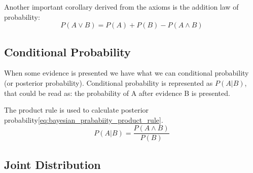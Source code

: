 Another important corollary derived from the axioms is the addition law of probability:
\begin{equation}
P(A\vee B)=P(A)+P(B) - P(A\wedge B)
\end{equation}

\subsection{Conditional Probability}
\label{subsubsec:conditionalprobability}
When some evidence is presented we have what we can conditional probability (or posterior probability). Conditional probability  is represented as $P(A|B)$, that could be read as: the probability of A after evidence B is presented. 

The product rule is used to calculate posterior probability\ref{eq:bayesian_prababiity_product_rule}.
\begin{equation}
\label{eq:bayesian_prababiity_product_rule}
P(A|B)=\frac{P(A\wedge B)}{P(B)}
\end{equation}


\subsection{Joint Distribution}

